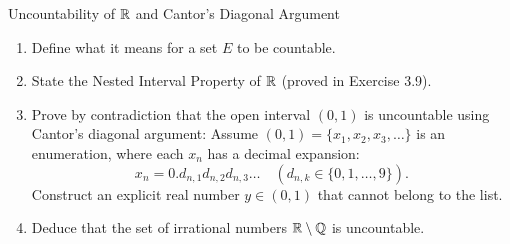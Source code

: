 \begin{exercise}{Uncountability of $\mathbb{R}$ and Cantor's Diagonal Argument}
\begin{enumerate}[leftmargin=1.5em,itemsep=2pt]
  \item Define what it means for a set $E$ to be countable.
  \item State the Nested Interval Property of $\mathbb{R}$ (proved in Exercise 3.9).
  \item Prove by contradiction that the open interval $(0, 1)$ is uncountable using Cantor's diagonal argument:
  Assume $(0, 1) = \{x_1, x_2, x_3, \dots\}$ is an enumeration, where each $x_n$ has a decimal expansion:
  \[
  x_n = 0.d_{n,1} d_{n,2} d_{n,3} \dots \quad (d_{n,k} \in \{0, 1, \dots, 9\}).
  \]
  Construct an explicit real number $y \in (0, 1)$ that cannot belong to the list.
  \item Deduce that the set of irrational numbers $\mathbb{R} \setminus \mathbb{Q}$ is uncountable.
\end{enumerate}
\end{exercise}

\begin{tabletworkspace}[5.5cm]
\end{tabletworkspace}

